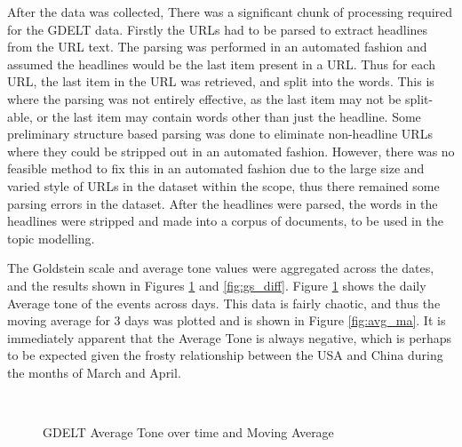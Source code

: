 After the data was collected, There was a significant chunk of processing required for the GDELT data. Firstly the URLs had to be parsed to extract headlines from the URL text. The parsing was performed in an automated fashion and assumed the headlines would be the last item present in a URL. Thus for each URL, the last item in the URL was retrieved, and split into the words. This is where the parsing was not entirely effective, as the last item may not be split-able, or the last item may contain words other than just the headline. Some preliminary structure based parsing was done to eliminate non-headline URLs where they could be stripped out in an automated fashion. However, there was no feasible method to fix this in an automated fashion due to the large size and varied style of URLs in the dataset within the scope, thus there remained some parsing errors in the dataset. After the headlines were parsed, the words in the headlines were stripped and made into a corpus of documents, to be used in the topic modelling. 

The Goldstein scale and average tone values were aggregated across the dates, and the results shown in Figures \ref{fig:avg_tone_diff} and \ref{fig:gs_diff}. Figure \ref{fig:avg_tone_diff} shows the daily Average tone of the events across days. This data is fairly chaotic, and thus the moving average for 3 days was plotted and is shown in Figure \ref{fig:avg_ma}. It is immediately apparent that the Average Tone is always negative, which is perhaps to be expected given the frosty relationship between the USA and China during the months of March and April. 
 
 \begin{figure}[H]
 	\centering
 	\\
 	\caption{GDELT Average Tone over time and Moving Average}
 	\label{fig:avg_tone_diff}
 \end{figure}
 
